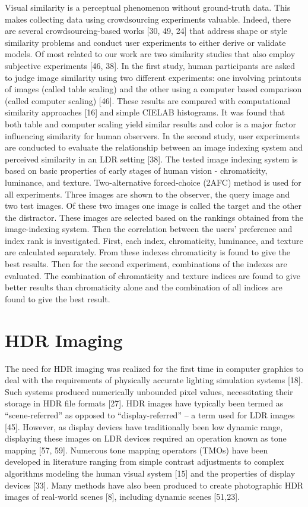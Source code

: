 Visual similarity is a perceptual phenomenon without ground-truth data. This makes collecting data using crowdsourcing experiments valuable. Indeed, there are several crowdsourcing-based works [30, 49, 24] that address shape or style similarity problems and conduct user experiments to either derive or validate models. Of most related to our work are two similarity studies that also employ subjective experiments [46, 38]. In the first study, human participants are asked to judge image similarity using two different experiments: one involving printouts of images (called table scaling) and the other using a computer based comparison (called computer scaling) [46]. These results are compared with computational similarity approaches [16] and simple CIELAB histograms. It was found that both table and computer scaling yield similar results and color is a major factor influencing similarity for human observers. In the second study, user experiments are conducted to evaluate the relationship between an image indexing system and perceived similarity in an LDR setting [38]. The tested image indexing system is based on basic properties of early stages of human vision - chromaticity, luminance, and texture. Two-alternative forced-choice (2AFC) method is used for all experiments. Three images are shown to the observer, the query image and two test images. Of these two images one image is called the target and the other the distractor. These images are selected based on the rankings obtained from the image-indexing system. Then the correlation between the users’ preference and index rank is investigated. First, each index, chromaticity, luminance, and texture are calculated separately. From these indexes chromaticity is found to give the best results. Then for the second experiment, combinations of the indexes are evaluated. The combination of chromaticity and texture indices are found to give better results than chromaticity alone and the combination of all indices are found to give the best result.
\section{HDR Imaging}
The need for HDR imaging was realized for the first time in computer graphics to deal with the requirements of physically accurate lighting simulation systems [18]. Such systems produced numerically unbounded pixel values, necessitating their storage in HDR file formats [27]. HDR images have typically been termed as “scene-referred” as opposed to “display-referred” – a term used for LDR images [45]. However, as display devices have traditionally been low dynamic range, displaying these images on LDR devices required an operation known as tone mapping [57, 59]. Numerous tone mapping operators (TMOs) have been developed in literature ranging from simple contrast adjustments to complex algorithms modeling the human visual system [15] and the properties of display devices [33]. Many methods have also been produced to create photographic HDR images of real-world scenes [8], including dynamic scenes [51,23].

